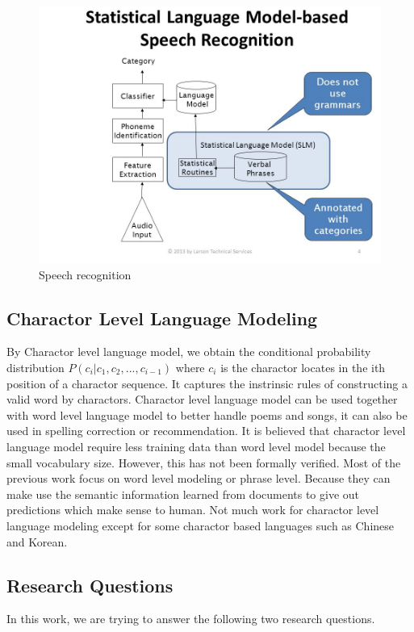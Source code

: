 \documentclass[]{article}
\begin{document}
\begin{figure}
	\includegraphics[scale=0.5]{speech.jpg}
	\caption{Speech recognition\cite{daniela2013speech}}
	\label{speech_recognition}
\end{figure}

\subsection{Charactor Level Language Modeling }
By Charactor level language model, we obtain the conditional probability distribution $P(c_i|c_1,c_2,...,c_{i-1})$ where $c_i$ is the charactor locates in the ith position of a charactor sequence. 
It captures the instrinsic rules of constructing a valid word by charactors.
Charactor level language model can be used together with word level language model to better handle poems and songs, it can also be used in spelling correction or recommendation.
It is believed that charactor level language model require less training data than word level model because the small vocabulary size.
However, this has not been formally verified.
Most of the previous work focus on word level modeling or phrase level.
Because they can make use the semantic information learned from documents to give out predictions which make sense to human. 
Not much work for charactor level language modeling except for some charactor based languages such as Chinese and Korean.




\subsection{Research Questions}
In this work, we are trying to answer the following two research questions.
\end{document}
